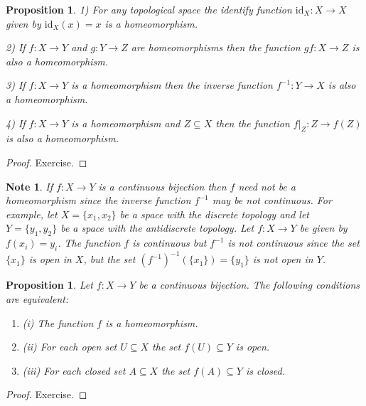 \documentclass[11pt, letterpaper, oneside]{report}
\theoremstyle{pplain}
\newtheorem{proposition}[theorem]{Proposition}
\newtheorem{ITERMVALUE THM}[theorem]{Intermediate Value Theorem}
\newtheorem{HEINEBOREL THM}[theorem]{Heine-Borel Theorem}
\newtheorem{UMETR THM}[theorem]{Urysohn Metrization Theorem}
\newtheorem{UMETR2 THM}[theorem]{Urysohn Metrization Theorem (v.2)}
\theoremstyle{ddefinition}
\newtheorem{note}[theorem]{Note}
\theoremstyle{nnn}
\newtheorem{TDA NN}[theorem]{Topological Data Analysis. }
\theoremstyle{eexercise}
\newcommand{\id}{\mathrm{id}}
\newcommand{\benu}{\begin{enumerate}}
\newcommand{\eenu}{\end{enumerate}}
\begin{document}
\begin{proposition} 
\label{HOMEO PROPERTIES PROP}
1)  For any topological space the identify function $\id_{X}\colon X\to X$ given by $\id_{X}(x) = x$
is a homeomorphism. 

2) If $f\colon X\to Y$ and $g\colon Y\to Z$ are homeomorphisms then the function $gf\colon X\to Z$
is also a homeomorphism.

3) If $f\colon X\to Y$ is a homeomorphism then the inverse function $f^{-1}\colon Y\to X$ is 
also a homeomorphism. 

4) If $f\colon X\to Y$ is a homeomorphism and $Z\subseteq X$ then the function $f|_{Z}\colon Z \to f(Z)$
is also a homeomorphism. 
\end{proposition}

\begin{proof}
Exercise. 
\end{proof}


\begin{note}
\label{CONT BIJ NOTE}
If $f\colon X\to Y$ is a continuous bijection then $f$ need not be a homeomorphism since the 
inverse function $f^{-1}$ may be not continuous. For example, let $X= \{x_{1}, x_{2}\}$ be a space 
with the discrete topology and let $Y= \{y_{1}, y_{2}\}$ be a space 
with the antidiscrete topology.  Let $f\colon X\to Y$  be given by $f(x_{i}) = y_{i}$. 
The function $f$ is continuous  but $f^{-1}$ is not continuous since the set $\{x_{1}\}$ is open in $X$, 
but the set $(f^{-1})^{-1}(\{x_{1}\}) = \{y_{1}\}$ is not open in $Y$. 
\end{note}


\begin{proposition}
\label{HOMEO OPEN PROP}
Let $f\colon X\to Y$ be a continuous bijection. The following conditions are equivalent:
\benu
\item[(i)] The function $f$ is a homeomorphism. 
\item[(ii)] For each open set $U\subseteq X$ the set $f(U)\subseteq Y$ is open. 
\item[(iii)] For each closed set $A\subseteq X$ the set $f(A)\subseteq Y$ is closed.   
\eenu
\end{proposition}

\begin{proof}
Exercise. 
\end{proof}
\end{document}
